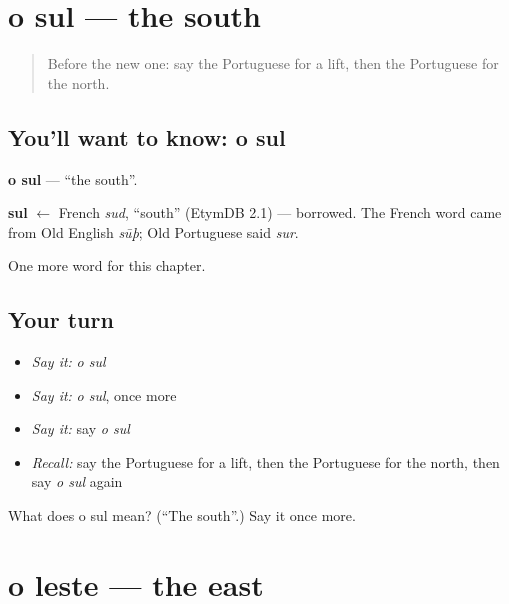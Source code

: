 \section[o sul]{o sul — the south}

\label{lesson:PT-C88-sul}



\begin{quote}
Before the new one: say the Portuguese for a lift, then the Portuguese for the north.
\end{quote}

\subsection*{You'll want to know: o sul}
\textbf{o sul} — \textquotedblleft{}the south\textquotedblright{}.

\begin{cousinweb}
\textbf{sul} $\leftarrow$ French \emph{sud}, \textquotedblleft{}south\textquotedblright{} (EtymDB 2.1) — borrowed. The French word came from Old English \emph{sūþ}; Old Portuguese said \emph{sur}.
\end{cousinweb}

\begin{grammarlens}[title={What you've built}]
One more word for this chapter.
\end{grammarlens}

\subsection*{Your turn}
\begin{itemize}
\raggedright
  \item \emph{Say it:} \emph{o sul}
  \item \emph{Say it:} \emph{o sul}, once more
  \item \emph{Say it:} say \emph{o sul}
  \item \emph{Recall:} say the Portuguese for a lift, then the Portuguese for the north, then say \emph{o sul} again
\end{itemize}

\begin{tcolorbox}[breakable,colback=teal!4,colframe=teal!35!black,title={Before you move on}]
What does o sul mean? (\textquotedblleft{}The south\textquotedblright{}.) Say it once more.
\end{tcolorbox}
\section[o leste]{o leste — the east}

